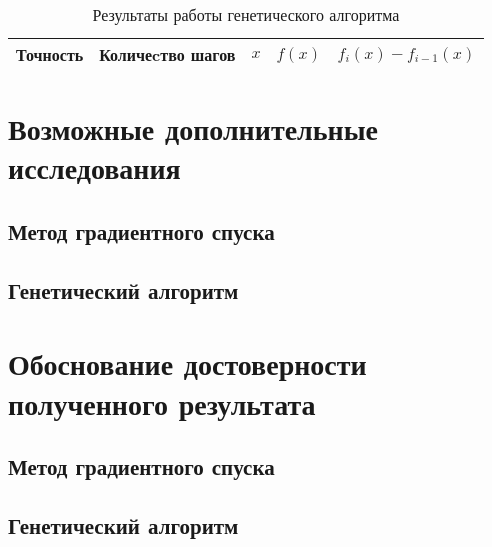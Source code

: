 \documentclass[10pt,a4paper,titlepage]{article}
\begin{document}
\begin{table}[H]
\caption{Результаты работы генетического алгоритма}
\label{gen-result-table}
\begin{center}
\begin{tabular}{|c|c|c|c|c|}
\hline
Точность & Количеcтво шагов & $x$ & $f(x)$ & $f_i(x) - f_{i - 1}(x)$ \\
\hline

\hline
\end{tabular}
\end{center}
\end{table}

\section{Возможные дополнительные исследования}
\subsection{Метод градиентного спуска}

\subsection{Генетический алгоритм}

\section{Обоснование достоверности полученного результата}
\subsection{Метод градиентного спуска}

\subsection{Генетический алгоритм}
\end{document}
